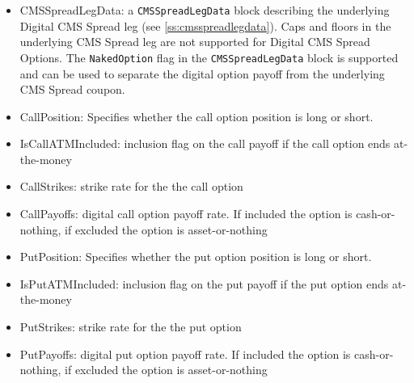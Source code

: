 \begin{itemize}
\item CMSSpreadLegData: a \lstinline!CMSSpreadLegData! block describing the underlying Digital CMS Spread leg (see \ref{ss:cmsspreadlegdata}). 
Caps and floors in the underlying CMS Spread leg are not supported for Digital CMS Spread Options. The \lstinline!NakedOption! flag in the
\lstinline!CMSSpreadLegData! block is supported and can be used to separate the digital option payoff from the underlying CMS Spread coupon.
\item CallPosition: Specifies whether the call option position is long or short.
\item IsCallATMIncluded: inclusion flag on the call payoff if the call option ends at-the-money
\item CallStrikes: strike rate for the the call option
\item CallPayoffs: digital call option payoff rate. If included the option is cash-or-nothing, if excluded the option is asset-or-nothing
\item PutPosition: Specifies whether the put option position is long  or short.
\item IsPutATMIncluded: inclusion flag on the put payoff if the put option ends at-the-money
\item PutStrikes: strike rate for the the put option
\item PutPayoffs: digital put option payoff rate. If included the option is cash-or-nothing, if excluded the option is asset-or-nothing
\end{itemize}

